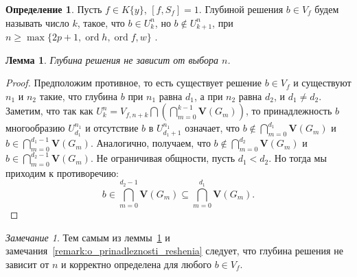\documentclass[16pt]{article}
\DeclareMathOperator{\ord}{ord}
\renewcommand{\ge}{\geqslant} %
\theoremstyle{plain1}
\newtheorem{lemma}[theorem1]{Лемма}
\theoremstyle{plain2}
\theoremstyle{plain}
\theoremstyle{plain3}
\theoremstyle{definition}
\newtheorem{definition}[theorem2]{Определение}
\theoremstyle{remark}
\newtheorem{remark}[theorem1]{Замечание}
\begin{document}
\begin{definition}
Пусть $f\in K\{y\}$, $[f,S_f]=1$.  Глубиной решения $b\in {V}_f$  будем называть число $k$, такое, что $b\in {U}_k^n$, но $b\not\in {U}_{k+1}^n$, при $n \ge\max\{ 2p+1,\ord{h},\ord{f},w\}$ .
\end{definition}



\begin{lemma}\label{lemma:o_nasledovanii}
Глубина решения не зависит от выбора $n$.

\end{lemma}

\begin{proof}
Предположим противное, то есть существует решение $b\in{V}_f$ и существуют $n_1$ и $n_2$ такие, что  глубина $b$ при $n_1$  равна $d_1$, а при $n_2$ равна $d_2$, и $d_1\not=d_2$. Заметим, что так как ${U}_k^n={V}_{f,n+k}\bigcap\left(\bigcap\limits_{m=0}^{k-1}\mathbf{V}\left(G_m\right)\right)$, то принадлежность $b$  многообразию ${U}_{d_1}^{n_1}$ и отсутствие $b$ в ${U}_{d_1+1}^{n_1}$ означает, что $b\not\in\bigcap\limits_{m=0}^{d_1}\mathbf{V}\left(G_m\right)$ и $b\in\bigcap\limits_{m=0}^{d_1-1}\mathbf{V}\left(G_m\right)$. Аналогично, получаем, что $b\not\in\bigcap\limits_{m=0}^{d_2}\mathbf{V}\left(G_m\right)$ и $b\in\bigcap\limits_{m=0}^{d_2-1}\mathbf{V}\left(G_m\right)$. Не ограничивая общности, пусть $d_1<d_2$. Но тогда мы приходим к противоречию: 
$$
b\in\bigcap\limits_{m=0}^{d_2-1}\mathbf{V}\left(G_m\right)\subseteq\bigcap\limits_{m=0}^{d_1}\mathbf{V}\left(G_m\right).
$$
\end{proof}

\begin{remark}\label{remark:o_sushestvovanii_gllubiny} Тем самым из леммы~\ref{lemma:o_nasledovanii} и замечания~\ref{remark:o_prinadleznosti_reshenia} следует, что глубина решения не зависит от $n$ и корректно определена для любого $b\in {V}_f$.
\end{remark}
\end{document}
